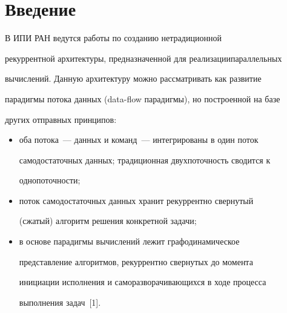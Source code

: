 




 \thispagestyle{empty}


 


 \vspace*{-3pt}





\section{Введение}


      


      В ИПИ РАН ведутся работы по созданию нетрадиционной 


рекуррентной архитектуры, предназначенной для реализации\linebreak параллельных 


вычислений. Данную архитектуру можно рас\-смат\-ри\-вать как развитие 


парадигмы потока данных (data-flow па\-ра\-диг\-мы), но построенной на базе 


других отправных принципов:


      \begin{itemize}


      \item


оба потока~--- данных и команд~--- интегрированы в один поток 


самодостаточных данных; традиционная двухпоточность сводится к 


однопоточности;


\item поток самодостаточных данных хранит рекуррентно свернутый 


(сжатый) алгоритм решения конкретной задачи;


\item в основе парадигмы вычислений лежит графодинамическое 


представление алгоритмов, рекуррентно свернутых до момента 


инициации исполнения и саморазворачивающихся в ходе процесса 


выполнения задач~[1].


\end{itemize}



